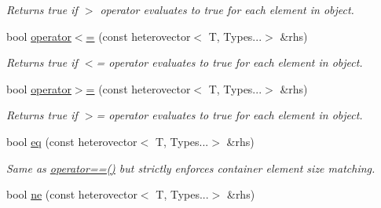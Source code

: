 \begin{DoxyCompactItemize}
\begin{DoxyCompactList}\small\item\em Returns true if $>$ operator evaluates to true for each element in object. \end{DoxyCompactList}\item 
\hypertarget{classheterogeneous_1_1heterovector_3_01_t_00_01_types_8_8_8_4_a12e5ae225ceaef6ae8126716c16a2c6a}{}bool \hyperlink{classheterogeneous_1_1heterovector_3_01_t_00_01_types_8_8_8_4_a12e5ae225ceaef6ae8126716c16a2c6a}{operator$<$=} (const heterovector$<$ T, Types...$>$ \&rhs)\label{classheterogeneous_1_1heterovector_3_01_t_00_01_types_8_8_8_4_a12e5ae225ceaef6ae8126716c16a2c6a}

\begin{DoxyCompactList}\small\item\em Returns true if $<$= operator evaluates to true for each element in object. \end{DoxyCompactList}\item 
\hypertarget{classheterogeneous_1_1heterovector_3_01_t_00_01_types_8_8_8_4_a2d4c9629e9441620fa811369c1cf1e7a}{}bool \hyperlink{classheterogeneous_1_1heterovector_3_01_t_00_01_types_8_8_8_4_a2d4c9629e9441620fa811369c1cf1e7a}{operator$>$=} (const heterovector$<$ T, Types...$>$ \&rhs)\label{classheterogeneous_1_1heterovector_3_01_t_00_01_types_8_8_8_4_a2d4c9629e9441620fa811369c1cf1e7a}

\begin{DoxyCompactList}\small\item\em Returns true if $>$= operator evaluates to true for each element in object. \end{DoxyCompactList}\item 
\hypertarget{classheterogeneous_1_1heterovector_3_01_t_00_01_types_8_8_8_4_a5a1754ca5e2e6741881128e27a10a41e}{}bool \hyperlink{classheterogeneous_1_1heterovector_3_01_t_00_01_types_8_8_8_4_a5a1754ca5e2e6741881128e27a10a41e}{eq} (const heterovector$<$ T, Types...$>$ \&rhs)\label{classheterogeneous_1_1heterovector_3_01_t_00_01_types_8_8_8_4_a5a1754ca5e2e6741881128e27a10a41e}

\begin{DoxyCompactList}\small\item\em Same as \hyperlink{classheterogeneous_1_1heterovector_3_01_t_00_01_types_8_8_8_4_ac8dd1f52458c618b942998d2a8641de7}{operator==()} but strictly enforces container element size matching. \end{DoxyCompactList}\item 
\hypertarget{classheterogeneous_1_1heterovector_3_01_t_00_01_types_8_8_8_4_a67c9de0053eabcba1ee8459f1f5e4696}{}bool \hyperlink{classheterogeneous_1_1heterovector_3_01_t_00_01_types_8_8_8_4_a67c9de0053eabcba1ee8459f1f5e4696}{ne} (const heterovector$<$ T, Types...$>$ \&rhs)\label{classheterogeneous_1_1heterovector_3_01_t_00_01_types_8_8_8_4_a67c9de0053eabcba1ee8459f1f5e4696}


\end{DoxyCompactItemize}
